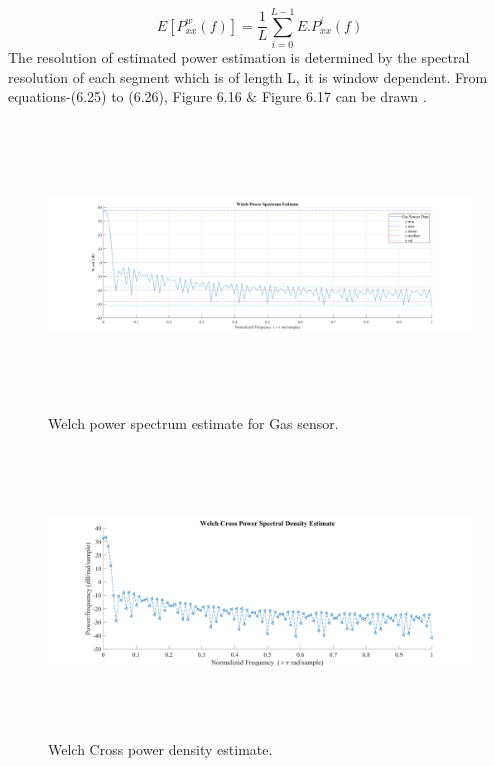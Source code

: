 \begin{equation}\tag{6.26}
E [ P_{xx}^{w} ( f )  ] =\frac{1}{L} \sum _{i=0}^{L-1}E.P_{xx}^{i} ( f )
\end{equation}
The resolution of estimated power estimation is determined by the spectral resolution of each segment which is of length L, it is window dependent. From equations-(6.25) to (6.26), Figure 6.16 $\&$  Figure 6.17 can be drawn \cite{chatterjee2018artificial}.
\begin{figure}[H]
	\begin{Center}
		\includegraphics[width=6.5in,height=3in]{31}
		\caption{Welch power spectrum estimate for Gas sensor.}
		\label{fig:_17_Welch_power_spectrum_estimate_for_Gas_sensor}
	\end{Center}
\end{figure}
\begin{figure}[H]
	\begin{Center}
		\includegraphics[width=6.5in,height=3in]{32}
	\end{Center}
\caption{Welch Cross power density estimate.}
\end{figure}

